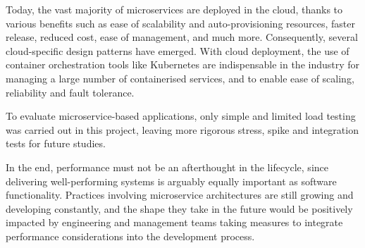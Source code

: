 Today, the vast majority of microservices are deployed in the cloud, thanks to various benefits such as ease of scalability and auto-provisioning resources, faster release, reduced cost, ease of management, and much more. Consequently, several cloud-specific design patterns have emerged. With cloud deployment, the use of container orchestration tools like Kubernetes are indispensable in the industry for managing a large number of containerised services, and to enable ease of scaling, reliability and fault tolerance.

To evaluate microservice-based applications, only simple and limited load testing was carried out in this project, leaving more rigorous stress, spike and integration tests for future studies.

In the end, performance must not be an afterthought in the lifecycle, since delivering well-performing systems is arguably equally important as software functionality. Practices involving microservice architectures are still growing and developing constantly, and the shape they take in the future would be positively impacted by engineering and management teams taking measures to integrate performance considerations into the development process.
